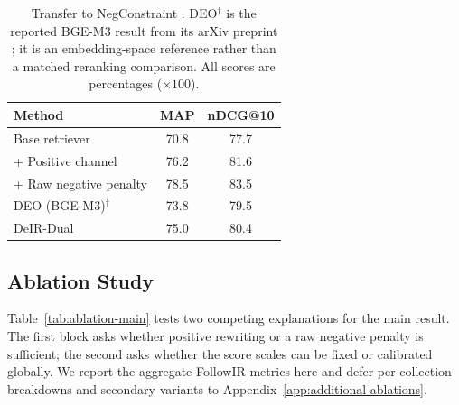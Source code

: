 \documentclass[letterpaper]{article}
\newcommand{\method}{DeIR-Dual}
\begin{document}
\begin{table}[!t]
\centering
\small
\begin{tabular}{lcc}
\toprule
\textbf{Method} & \textbf{MAP} & \textbf{nDCG@10} \\
\midrule
Base retriever & 70.8 & 77.7 \\
+ Positive channel & 76.2 & 81.6 \\
+ Raw negative penalty & 78.5 & 83.5 \\
DEO (BGE-M3)$^{\dagger}$ & 73.8 & 79.5 \\
\method{} & 75.0 & 80.4 \\
\bottomrule
\end{tabular}
\caption{Transfer to NegConstraint \cite{xu2025logical}.  DEO$^{\dagger}$
  is the reported BGE-M3 result from its arXiv preprint \cite{deo2026};
  it is an embedding-space reference rather than a matched reranking
  comparison.  All scores are percentages ($\times 100$).}
\label{tab:negation-transfer}
\end{table}

\subsection{Ablation Study}
\label{sec:mechanism-analysis}

Table~\ref{tab:ablation-main} tests two competing explanations for the
main result.  The first block asks whether positive rewriting or a raw
negative penalty is sufficient; the second asks whether the score scales
can be fixed or calibrated globally.  We report the aggregate FollowIR
metrics here and defer per-collection breakdowns and secondary variants
to Appendix~\ref{app:additional-ablations}.
\end{document}
